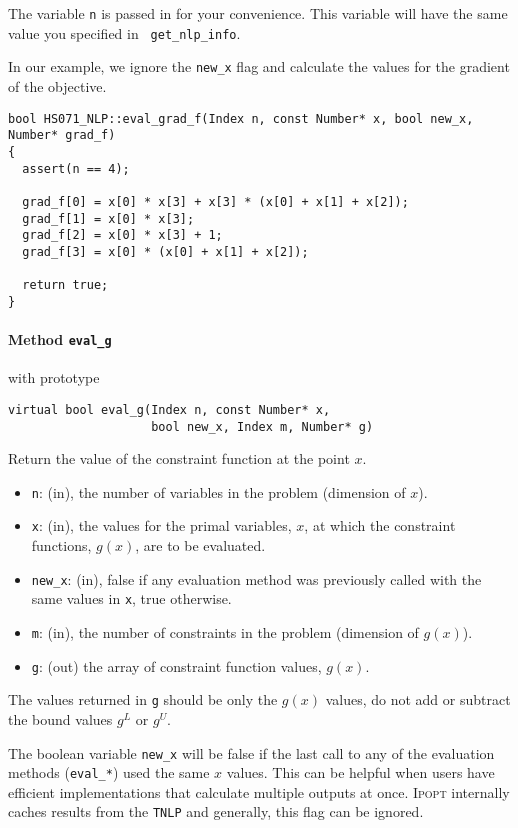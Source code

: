 \documentclass[10pt]{article}
\newcommand{\Ipopt}{\textsc{Ipopt}\xspace}
\begin{document}
The variable {\tt n} is passed in for your convenience. This
variable will have the same value you specified in {\tt
get\_nlp\_info}.

In our example, we ignore the {\tt new\_x} flag and calculate the
values for the gradient of the objective.

\begin{footnotesize}
\begin{verbatim}
bool HS071_NLP::eval_grad_f(Index n, const Number* x, bool new_x, Number* grad_f)
{
  assert(n == 4);

  grad_f[0] = x[0] * x[3] + x[3] * (x[0] + x[1] + x[2]);
  grad_f[1] = x[0] * x[3];
  grad_f[2] = x[0] * x[3] + 1;
  grad_f[3] = x[0] * (x[0] + x[1] + x[2]);

  return true;
}
\end{verbatim}
\end{footnotesize}

\paragraph{Method {\texttt{eval\_g}}} with prototype
\begin{verbatim}
virtual bool eval_g(Index n, const Number* x, 
                    bool new_x, Index m, Number* g)
\end{verbatim}
Return the value of the constraint function at the point $x$.
\begin{itemize}
\item {\tt n}: (in), the number of variables in the problem (dimension of $x$). 
\item {\tt x}: (in), the values for the primal variables, $x$, at
  which the constraint functions,
  $g(x)$, are to be evaluated.
\item {\tt new\_x}: (in), false if any evaluation method was previously called 
        with the same values in {\tt x}, true otherwise.
\item {\tt m}: (in), the number of constraints in the problem (dimension of $g(x)$).
\item {\tt g}: (out) the array of constraint function values, $g(x)$.
\end{itemize}

The values returned in {\tt g} should be only the $g(x)$ values, 
do not add or subtract the bound values $g^L$ or $g^U$.

The boolean variable {\tt new\_x} will be false if the last call to
any of the evaluation methods ({\tt eval\_*}) used the same $x$
values. This can be helpful when users have efficient implementations
that calculate multiple outputs at once. \Ipopt internally caches
results from the {\tt TNLP} and generally, this flag can be ignored.
\end{document}
